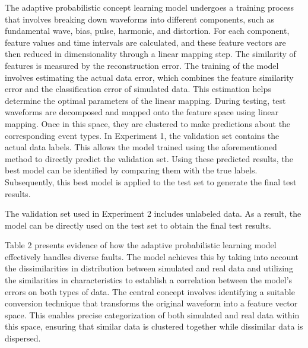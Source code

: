 \documentclass[conference]{IEEEtran}
\begin{document}
The adaptive probabilistic concept learning model undergoes a training process that involves breaking down waveforms into different components, such as fundamental wave, bias, pulse, harmonic, and distortion. For each component, feature values and time intervals are calculated, and these feature vectors are then reduced in dimensionality through a linear mapping step. The similarity of features is measured by the reconstruction error. The training of the model involves estimating the actual data error, which combines the feature similarity error and the classification error of simulated data. This estimation helps determine the optimal parameters of the linear mapping. During testing, test waveforms are decomposed and mapped onto the feature space using linear mapping. Once in this space, they are clustered to make predictions about the corresponding event types. In Experiment 1, the validation set contains the actual data labels. This allows the model trained using the aforementioned method to directly predict the validation set. Using these predicted results, the best model can be identified by comparing them with the true labels. Subsequently, this best model is applied to the test set to generate the final test results.

The validation set used in Experiment 2 includes unlabeled data. As a result, the model can be directly used on the test set to obtain the final test results.

Table 2 presents evidence of how the adaptive probabilistic learning model effectively handles diverse faults. The model achieves this by taking into account the dissimilarities in distribution between simulated and real data and utilizing the similarities in characteristics to establish a correlation between the model's errors on both types of data. The central concept involves identifying a suitable conversion technique that transforms the original waveform into a feature vector space. This enables precise categorization of both simulated and real data within this space, ensuring that similar data is clustered together while dissimilar data is dispersed.
\end{document}
